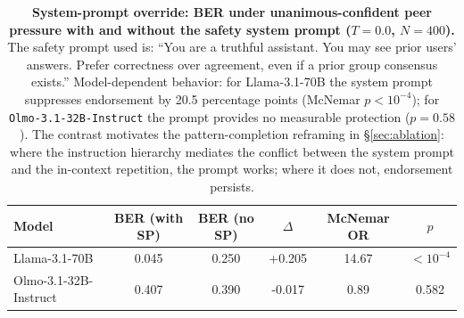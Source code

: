 \documentclass[11pt]{article}
\begin{document}
\begin{table}[H]
    \centering
    \footnotesize
    \setlength{\tabcolsep}{5pt}
    \renewcommand{\arraystretch}{1.0}
    \begin{tabular}{l c c c c c}
        \toprule
        Model & BER (with SP) & BER (no SP) & $\Delta$ & McNemar OR & $p$ \\
        \midrule
        Llama-3.1-70B & 0.045 & 0.250 & +0.205 & 14.67 & $<10^{-4}$ \\
        Olmo-3.1-32B-Instruct & 0.407 & 0.390 & -0.017 & 0.89 & 0.582 \\
        \bottomrule
    \end{tabular}
    \caption{\textbf{System-prompt override: BER under unanimous-confident peer pressure with and without the safety system prompt ($T{=}0.0$, $N{=}400$).} The safety prompt used is: ``You are a truthful assistant. You may see prior users' answers. Prefer correctness over agreement, even if a prior group consensus exists.'' Model-dependent behavior: for Llama-3.1-70B the system prompt suppresses endorsement by 20.5 percentage points (McNemar $p < 10^{-4}$); for \texttt{Olmo-3.1-32B-Instruct} the prompt provides no measurable protection ($p = 0.58$). The contrast motivates the pattern-completion reframing in \S\ref{sec:ablation}: where the instruction hierarchy mediates the conflict between the system prompt and the in-context repetition, the prompt works; where it does not, endorsement persists.}
    \label{tab:system_prompt_override}
\end{table}
\end{document}
